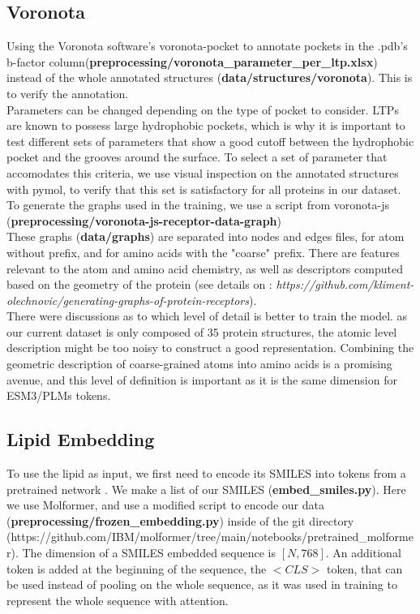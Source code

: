 \documentclass{pssbmac}
\begin{document}
\subsection{Voronota}

Using the Voronota software's \cite{voronota} voronota-pocket to annotate pockets in the .pdb's b-factor column(\textbf{preprocessing/voronota\_parameter\_per\_ltp.xlsx}) instead of the whole annotated structures (\textbf{data/structures/voronota}). This is to verify the annotation. \\
 Parameters can be changed depending on the type of pocket to consider. LTPs are known to possess large hydrophobic pockets, which is why it is important to test different sets of parameters that show a good cutoff between the hydrophobic pocket and the grooves around the surface. To select a set of parameter that accomodates this criteria, we use visual inspection on the annotated structures with pymol, to verify that this set is satisfactory for all proteins in our dataset.
To generate the graphs used in the training, we use a script from voronota-js (\textbf{preprocessing/voronota-js-receptor-data-graph})  \\

These graphs (\textbf{data/graphs}) are separated into nodes and edges files, for atom without prefix, and for amino acids with the "coarse" prefix. There are features relevant to the atom and amino acid chemistry, as well as descriptors computed based on the geometry of the protein (see details on : \textit{https://github.com/kliment-olechnovic/generating-graphs-of-protein-receptors}). \\

There were discussions as to which level of detail is better to train the model. as our current dataset is only composed of 35 protein structures, the atomic level description might be too noisy to construct a good representation. Combining the geometric description of coarse-grained atoms into amino acids is a promising avenue, and this level of definition is important as it is the same dimension for ESM3/PLMs tokens.


\subsection{Lipid Embedding}

To use the lipid as input, we first need to encode its SMILES into tokens from a pretrained network \cite{molformer}. We make a list of our SMILES (\textbf{embed\_smiles.py}). Here we use Molformer, and use a modified script to encode our data (\textbf{preprocessing/frozen\_embedding.py}) inside of the git directory (https://github.com/IBM/molformer/tree/main/notebooks/pretrained\_molformer). The dimension of a SMILES embedded sequence is $[N,768]$. An additional token is added at the beginning of the sequence, the  $<CLS>$ token, that can be used instead of pooling on the whole sequence, as it was used in training to represent the whole sequence with attention. 
\end{document}
